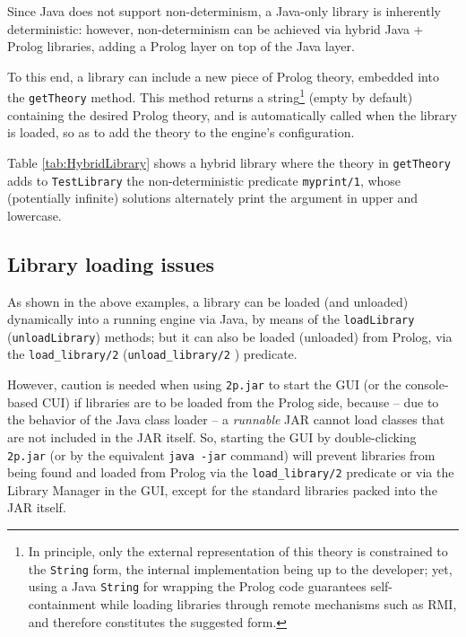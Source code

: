 Since Java does not support non-determinism, a Java-only library is inherently
deterministic: however, non-determinism can be achieved via hybrid Java + Prolog
libraries, adding a %
Prolog layer on top of the %
Java layer.

To this end, a library can include a new piece of Prolog theory, embedded into the \texttt{getTheory} method.
%
This method returns a string\footnote{%
    In principle, only the external representation of this theory is constrained to the \texttt{String} form, the internal implementation being up to the developer; yet, using a Java \texttt{String} for wrapping the Prolog code guarantees self-containment while loading libraries through remote mechanisms such as RMI, and therefore constitutes the suggested form.
} (empty by default) containing the desired Prolog theory, and is automatically called when the library is loaded, so as to add the theory to the engine's configuration.

Table \ref{tab:HybridLibrary} shows a hybrid library where the theory in \texttt{getTheory} adds to \texttt{TestLibrary} the non-deterministic predicate \texttt{myprint/1}, whose (potentially infinite) solutions alternately print the argument in upper and lowercase.


\subsection{Library loading issues}
\label{ssec:library-loading-issues}

As shown in the above examples, a library can be loaded (and unloaded) dynamically into a running engine via Java, by means of the \texttt{loadLibrary} (\texttt{unloadLibrary}) methods; but it can also be loaded (unloaded) from Prolog, via the \texttt{load\_library/2} (\texttt{unload\_library/2} ) predicate.

However, caution is needed when using \texttt{2p.jar} to start the \tuprolog{} GUI (or the console-based CUI) if libraries are to be loaded from the Prolog side, because -- due to the behavior of the Java class loader -- a \textit{runnable} JAR cannot load classes that are not included in the JAR itself.
So, starting the \tuprolog{} GUI by double-clicking \texttt{2p.jar} (or by the equivalent \texttt{java -jar} command) will prevent libraries from being found and loaded from Prolog via the \texttt{load\_library/2} predicate or via the Library Manager in the GUI, except for the standard libraries packed into the \tuprolog{} JAR itself.

